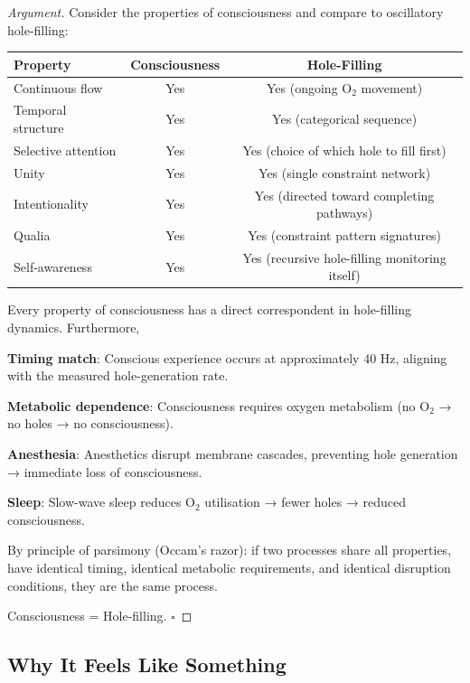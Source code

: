 \documentclass[11pt,a4paper]{article}
\begin{document}
\begin{proof}[Argument]
Consider the properties of consciousness and compare to oscillatory hole-filling:

\begin{table}[H]
\centering
\begin{tabular}{lcc}
\toprule
\textbf{Property} & \textbf{Consciousness} & \textbf{Hole-Filling} \\
\midrule
Continuous flow & Yes & Yes (ongoing O$_2$ movement) \\
Temporal structure & Yes & Yes (categorical sequence) \\
Selective attention & Yes & Yes (choice of which hole to fill first) \\
Unity & Yes & Yes (single constraint network) \\
Intentionality & Yes & Yes (directed toward completing pathways) \\
Qualia & Yes & Yes (constraint pattern signatures) \\
Self-awareness & Yes & Yes (recursive hole-filling monitoring itself) \\
\bottomrule
\end{tabular}
\end{table}

Every property of consciousness has a direct correspondent in hole-filling dynamics. Furthermore,

\textbf{Timing match}: Conscious experience occurs at approximately 40 Hz, aligning with the measured hole-generation rate.

\textbf{Metabolic dependence}: Consciousness requires oxygen metabolism (no O$_2$ → no holes → no consciousness).

\textbf{Anesthesia}: Anesthetics disrupt membrane cascades, preventing hole generation → immediate loss of consciousness.

\textbf{Sleep}: Slow-wave sleep reduces O$_2$ utilisation → fewer holes → reduced consciousness.

By principle of parsimony (Occam's razor): if two processes share all properties, have identical timing, identical metabolic requirements, and identical disruption conditions, they are the same process.

Consciousness = Hole-filling. $\square$
\end{proof}

\subsection{Why It Feels Like Something}
\end{document}
